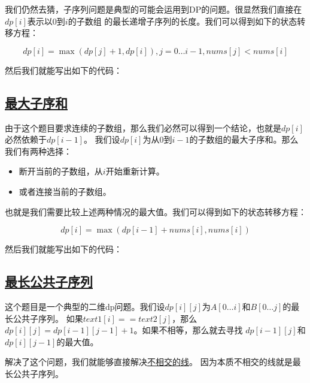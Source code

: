 \documentclass[../../main.tex]{subfiles}
\begin{document}
我们仍然去猜，子序列问题是典型的可能会运用到DP的问题。很显然我们直接在$dp[i]$表示以0到$i$的子数组
的最长递增子序列的长度。我们可以得到如下的状态转移方程：

$$
dp[i] = \max (dp[j] + 1, dp[i]), j = 0 \dots i -1, nums[j] < nums[i]
$$

然后我们就能写出如下的代码：



\subsection{\href{https://leetcode.cn/problems/maximum-subarray/}{最大子序和}}

由于这个题目要求连续的子数组，那么我们必然可以得到一个结论，也就是$dp[i]$必然依赖于$dp[i - 1]$。
我们设$dp[i]$为从0到$i - 1$的子数组的最大子序和。那么我们有两种选择：

\begin{itemize}
  \item 断开当前的子数组，从$i$开始重新计算。
  \item 或者连接当前的子数组。
\end{itemize}

也就是我们需要比较上述两种情况的最大值。我们可以得到如下的状态转移方程：

$$
dp[i] = \max(dp[i - 1] + nums[i], nums[i])
$$

然后我们就能写出如下的代码：



\subsection{\href{https://leetcode.cn/problems/longest-common-subsequence/}{最长公共子序列}}

这个题目是一个典型的二维dp问题。我们设$dp[i][j]$为$A[0 \dots i]$和$B[0 \dots j]$的最长公共子序列。
如果$text1[i] == text2[j]$，那么$dp[i][j] = dp[i - 1][j - 1] + 1$。如果不相等，那么就去寻找
$dp[i - 1][j]$和$dp[i][j - 1]$的最大值。



\begin{kaobox}[title=相似题目]
  解决了这个问题，我们就能够直接解决\href{https://leetcode.cn/problems/uncrossed-lines/}{不相交的线}。
  因为本质不相交的线就是最长公共子序列。
\end{kaobox}
\end{document}
